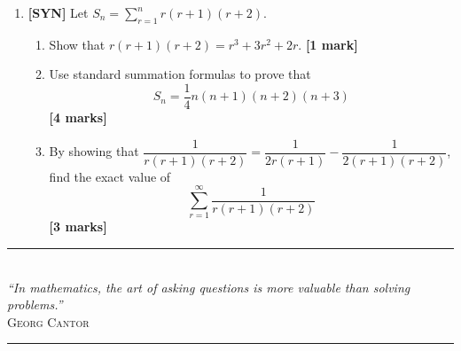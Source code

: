 \documentclass[11pt,a4paper]{article}
\begin{document}
\begin{enumerate}[resume]
\item \textbf{[SYN]} Let $S_n = \displaystyle\sum_{r=1}^n r(r+1)(r+2)$.
\begin{enumerate}[label=(\alph*)]
  \item Show that $r(r+1)(r+2) = r^3 + 3r^2 + 2r$. \hfill{\textbf{[1 mark]}}
  \item Use standard summation formulas to prove that
  \[
  S_n = \frac{1}{4}n(n+1)(n+2)(n+3)
  \]
  \hfill{\textbf{[4 marks]}}
  \item By showing that $\dfrac{1}{r(r+1)(r+2)} = \dfrac{1}{2r(r+1)} - \dfrac{1}{2(r+1)(r+2)}$, find the exact value of
  \[
  \sum_{r=1}^\infty \frac{1}{r(r+1)(r+2)}
  \]
  \hfill{\textbf{[3 marks]}}
\end{enumerate}

\end{enumerate}

\vspace{14pt}
\begin{center}
  {\color{accentline}\rule{0.4\textwidth}{0.4pt}}\\[5pt]
  {\footnotesize\itshape\color{medgray} ``In mathematics, the art of asking questions is more valuable than solving problems.''}\\[2pt]
  {\scriptsize\scshape\color{medgray} Georg Cantor}\\[5pt]
  {\color{accentline}\rule{0.4\textwidth}{0.4pt}}
\end{center}
\end{document}
